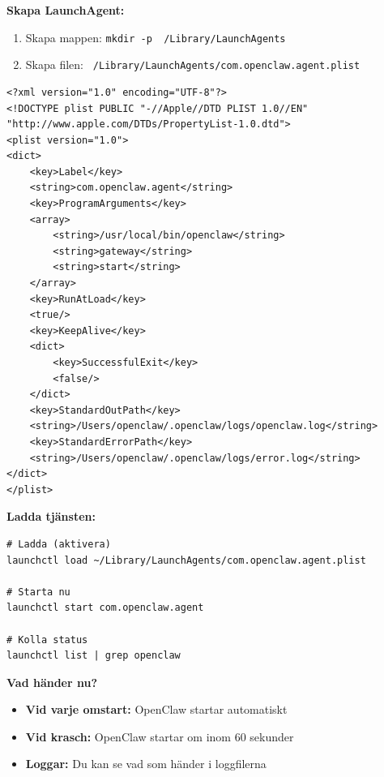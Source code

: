 \documentclass[12pt,a4paper,swedish]{article}
\begin{document}
\bigskip

\textbf{Skapa LaunchAgent:}

\begin{enumerate}
    \item Skapa mappen: \texttt{mkdir -p ~/Library/LaunchAgents}
    \item Skapa filen: \texttt{~/Library/LaunchAgents/com.openclaw.agent.plist}
\end{enumerate}

\bigskip

\begin{lstlisting}[style=xml]
<?xml version="1.0" encoding="UTF-8"?>
<!DOCTYPE plist PUBLIC "-//Apple//DTD PLIST 1.0//EN" 
"http://www.apple.com/DTDs/PropertyList-1.0.dtd">
<plist version="1.0">
<dict>
    <key>Label</key>
    <string>com.openclaw.agent</string>
    <key>ProgramArguments</key>
    <array>
        <string>/usr/local/bin/openclaw</string>
        <string>gateway</string>
        <string>start</string>
    </array>
    <key>RunAtLoad</key>
    <true/>
    <key>KeepAlive</key>
    <dict>
        <key>SuccessfulExit</key>
        <false/>
    </dict>
    <key>StandardOutPath</key>
    <string>/Users/openclaw/.openclaw/logs/openclaw.log</string>
    <key>StandardErrorPath</key>
    <string>/Users/openclaw/.openclaw/logs/error.log</string>
</dict>
</plist>
\end{lstlisting}

\bigskip

\textbf{Ladda tjänsten:}

\begin{lstlisting}[style=latex]
# Ladda (aktivera)
launchctl load ~/Library/LaunchAgents/com.openclaw.agent.plist

# Starta nu
launchctl start com.openclaw.agent

# Kolla status
launchctl list | grep openclaw
\end{lstlisting}

\bigskip

\textbf{Vad händer nu?}
\begin{itemize}
    \item \textbf{Vid varje omstart:} OpenClaw startar automatiskt
    \item \textbf{Vid krasch:} OpenClaw startar om inom 60 sekunder
    \item \textbf{Loggar:} Du kan se vad som händer i loggfilerna
\end{itemize}

\newpage
\end{document}
